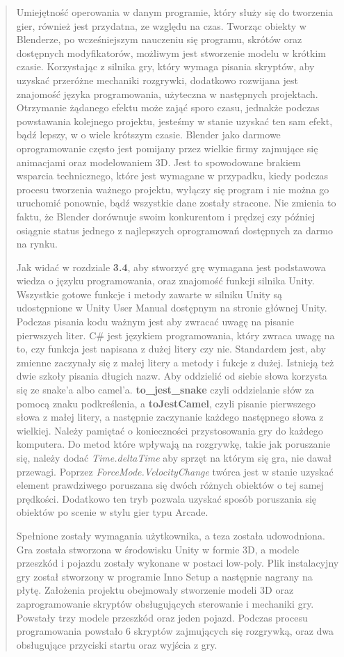 \begin{quotation}
\indent Umiejętność operowania w danym programie, który służy się do tworzenia gier, również jest przydatna, ze względu na czas. Tworząc obiekty w Blenderze, po wcześniejszym nauczeniu się programu, skrótów oraz dostępnych modyfikatorów, możliwym jest stworzenie modelu w krótkim czasie. Korzystając z silnika gry, który wymaga pisania skryptów, aby uzyskać przeróżne mechaniki rozgrywki, dodatkowo rozwijana jest znajomość języka programowania, użyteczna w następnych projektach. Otrzymanie żądanego efektu może zająć sporo czasu, jednakże podczas powstawania kolejnego projektu, jesteśmy w stanie uzyskać ten sam efekt, bądź lepszy, w o wiele krótszym czasie. Blender jako darmowe oprogramowanie często jest pomijany przez wielkie firmy zajmujące się animacjami oraz modelowaniem 3D. Jest to spowodowane brakiem wsparcia technicznego, które jest wymagane w przypadku, kiedy podczas procesu tworzenia ważnego projektu, wyłączy się program i nie można go uruchomić ponownie, bądź wszystkie dane zostały stracone. Nie zmienia to faktu, że Blender dorównuje swoim konkurentom i prędzej czy później osiągnie status jednego z najlepszych oprogramowań dostępnych za darmo na rynku.

\indent Jak widać w rozdziale \textbf{3.4}, aby stworzyć grę wymagana jest podstawowa wiedza o języku programowania, oraz znajomość funkcji silnika Unity. Wszystkie gotowe funkcje i metody zawarte w silniku Unity są udostępnione w Unity User Manual dostępnym na stronie głównej Unity. Podczas pisania kodu ważnym jest aby zwracać uwagę na pisanie pierwszych liter. C\# jest językiem programowania, który zwraca uwagę na to, czy funkcja jest napisana z dużej litery czy nie. Standardem jest, aby zmienne zaczynały się z małej litery a metody i fukcje z dużej. Istnieją też dwie szkoły pisania długich nazw. Aby oddzielić od siebie słowa korzysta się ze snake'a albo camel'a. \textbf{to\_jest\_snake} czyli oddzielanie słów za pomocą znaku podkreślenia, a \textbf{toJestCamel}, czyli pisanie pierwszego słowa z małej litery, a następnie zaczynanie każdego następnego słowa z wielkiej. 
\indent Należy pamiętać o konieczności przystosowania gry do każdego komputera. Do metod które wpływają na rozgrywkę, takie jak poruszanie się, należy dodać \textit{Time.deltaTime} aby sprzęt na którym się gra, nie dawał przewagi. Poprzez \textit{ForceMode.VelocityChange} twórca jest w stanie uzyskać element prawdziwego poruszana się dwóch różnych obiektów o tej samej prędkości. Dodatkowo ten tryb pozwala uzyskać sposób poruszania się obiektów po scenie w stylu gier typu Arcade.

\indent Spełnione zostały wymagania użytkownika, a teza została udowodniona. Gra została stworzona w środowisku Unity w formie 3D, a modele przeszkód i pojazdu zostały wykonane w postaci low-poly. Plik instalacyjny gry został stworzony w programie Inno Setup a następnie nagrany na płytę. Założenia projektu obejmowały stworzenie modeli 3D oraz zaprogramowanie skryptów obsługujących sterowanie i mechaniki gry. Powstały trzy modele przeszkód oraz jeden pojazd. Podczas procesu programowania powstało 6 skryptów zajmujących się rozgrywką, oraz dwa obsługujące przyciski startu oraz wyjścia z gry. 
\end{quotation}
